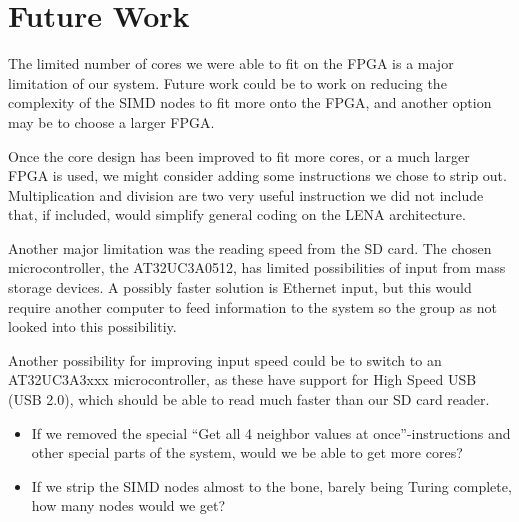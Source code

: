 \section{Future Work}
The limited number of cores we were able to fit on the FPGA is a major limitation
of our system. Future work could be to work on reducing the complexity of the
SIMD nodes to fit more onto the FPGA, and another option may be to choose a larger
FPGA.

Once the core design has been improved to fit more cores, or a much larger FPGA is
used, we might consider adding some instructions we chose to strip out. Multiplication
and division are two very useful instruction we did not include that, if included, would simplify
general coding on the LENA architecture.

Another major limitation was the reading speed from the SD card.
The chosen microcontroller, the AT32UC3A0512, has limited possibilities of input
from mass storage devices. A possibly faster solution is Ethernet input, but this
would require another computer to feed information to the system so the group
as not looked into this possibilitiy.

Another possibility for improving input speed could be to switch to an AT32UC3A3xxx
microcontroller, as these have support for High Speed USB (USB 2.0), which should be
able to read much faster than our SD card reader.

\begin{itemize}
\item If we removed the special ``Get all 4 neighbor values at
  once''-instructions and other special parts of the system, would we be able to
  get more cores?
\item If we strip the \ac{SIMD} nodes almost to the bone, barely being Turing
  complete, how many nodes would we get?
\end{itemize}
